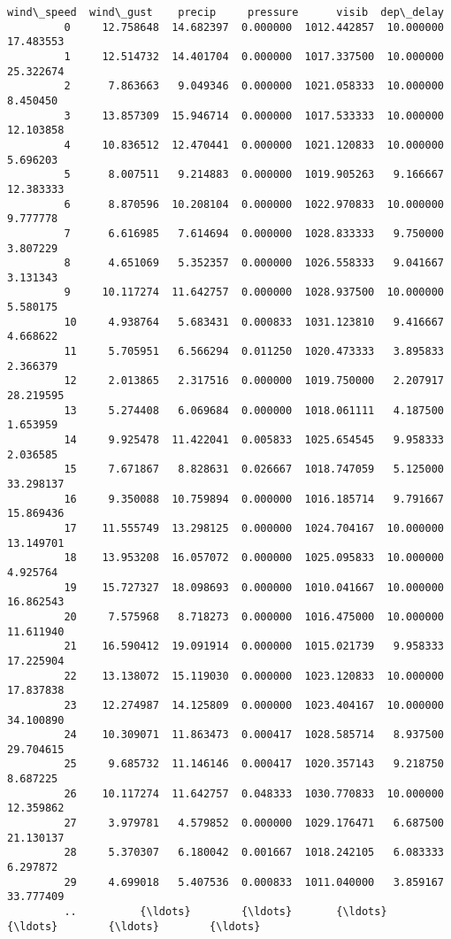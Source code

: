 \documentclass[11pt]{article}
\begin{document}
\begin{Verbatim}[commandchars=\\\{\}]
              wind\_speed  wind\_gust    precip     pressure      visib  dep\_delay  
         0     12.758648  14.682397  0.000000  1012.442857  10.000000  17.483553  
         1     12.514732  14.401704  0.000000  1017.337500  10.000000  25.322674  
         2      7.863663   9.049346  0.000000  1021.058333  10.000000   8.450450  
         3     13.857309  15.946714  0.000000  1017.533333  10.000000  12.103858  
         4     10.836512  12.470441  0.000000  1021.120833  10.000000   5.696203  
         5      8.007511   9.214883  0.000000  1019.905263   9.166667  12.383333  
         6      8.870596  10.208104  0.000000  1022.970833  10.000000   9.777778  
         7      6.616985   7.614694  0.000000  1028.833333   9.750000   3.807229  
         8      4.651069   5.352357  0.000000  1026.558333   9.041667   3.131343  
         9     10.117274  11.642757  0.000000  1028.937500  10.000000   5.580175  
         10     4.938764   5.683431  0.000833  1031.123810   9.416667   4.668622  
         11     5.705951   6.566294  0.011250  1020.473333   3.895833   2.366379  
         12     2.013865   2.317516  0.000000  1019.750000   2.207917  28.219595  
         13     5.274408   6.069684  0.000000  1018.061111   4.187500   1.653959  
         14     9.925478  11.422041  0.005833  1025.654545   9.958333   2.036585  
         15     7.671867   8.828631  0.026667  1018.747059   5.125000  33.298137  
         16     9.350088  10.759894  0.000000  1016.185714   9.791667  15.869436  
         17    11.555749  13.298125  0.000000  1024.704167  10.000000  13.149701  
         18    13.953208  16.057072  0.000000  1025.095833  10.000000   4.925764  
         19    15.727327  18.098693  0.000000  1010.041667  10.000000  16.862543  
         20     7.575968   8.718273  0.000000  1016.475000  10.000000  11.611940  
         21    16.590412  19.091914  0.000000  1015.021739   9.958333  17.225904  
         22    13.138072  15.119030  0.000000  1023.120833  10.000000  17.837838  
         23    12.274987  14.125809  0.000000  1023.404167  10.000000  34.100890  
         24    10.309071  11.863473  0.000417  1028.585714   8.937500  29.704615  
         25     9.685732  11.146146  0.000417  1020.357143   9.218750   8.687225  
         26    10.117274  11.642757  0.048333  1030.770833  10.000000  12.359862  
         27     3.979781   4.579852  0.000000  1029.176471   6.687500  21.130137  
         28     5.370307   6.180042  0.001667  1018.242105   6.083333   6.297872  
         29     4.699018   5.407536  0.000833  1011.040000   3.859167  33.777409  
         ..          {\ldots}        {\ldots}       {\ldots}          {\ldots}        {\ldots}        {\ldots}  

\end{Verbatim}
\end{document}
